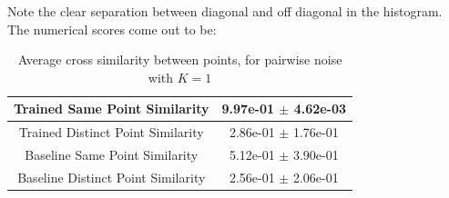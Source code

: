 \documentclass[a4paper]{article}
\begin{document}
Note the clear separation between diagonal and off diagonal in the histogram. The numerical scores come out to be: 
\begin{table}[H]
    \centering
    \begin{tabular}{|c|c|} \hline
        Trained Same Point Similarity      & 9.97e-01 $\pm$ 4.62e-03  \\ \hline
        Trained Distinct Point Similarity  & 2.86e-01 $\pm$ 1.76e-01  \\ \hline
        Baseline Same Point Similarity     & 5.12e-01 $\pm$ 3.90e-01  \\ \hline
        Baseline Distinct Point Similarity & 2.56e-01 $\pm$ 2.06e-01  \\ \hline
    \end{tabular}
    \caption{Average cross similarity between points, for pairwise noise with $K=1$}
    \label{tab:pairwise_table}
\end{table}
\end{document}
